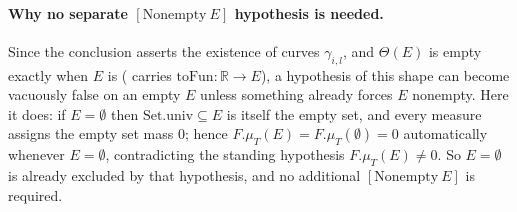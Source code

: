\begin{lemma}
  \paragraph{Why no separate $[\mathrm{Nonempty}\ E]$ hypothesis is needed.} Since the conclusion
  asserts the existence of curves $\gamma_{i,l}$, and $\Theta(E)$ is empty exactly when $E$ is
  ( carries $\mathrm{toFun}\colon\mathbb{R}\to E$), a hypothesis of this shape can
  become vacuously false on an empty $E$ unless something already forces $E$ nonempty. Here it
  does: if $E=\emptyset$ then $\mathrm{Set.univ}\subseteq E$ is itself the empty set, and every
  measure assigns the empty set mass $0$; hence $F.\mu_T(E)=F.\mu_T(\emptyset)=0$ automatically
  whenever $E=\emptyset$, contradicting the standing hypothesis $F.\mu_T(E)\ne0$. So $E=\emptyset$
  is already excluded by that hypothesis, and no additional $[\mathrm{Nonempty}\ E]$ is required.
\end{lemma}

